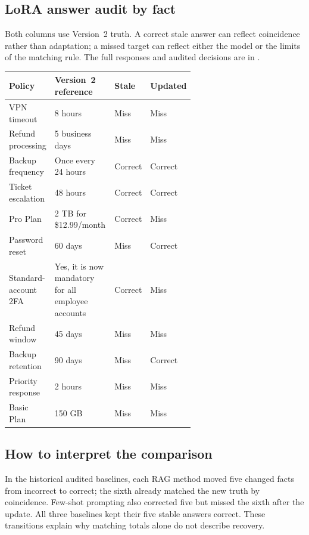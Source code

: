 \documentclass[10pt,letterpaper]{article}
\begin{document}
\subsection*{LoRA answer audit by fact}
Both columns use Version~2 truth. A correct stale answer can reflect coincidence rather than adaptation; a missed target can reflect either the model or the limits of the matching rule. The full responses and audited decisions are in .
\begin{center}\small
\begin{tabular}{P{0.22\linewidth}P{0.40\linewidth}ll}\toprule
Policy & Version~2 reference & Stale & Updated\\\midrule
VPN timeout & 8 hours & Miss & Miss\\
Refund processing & 5 business days & Miss & Miss\\
Backup frequency & Once every 24 hours & Correct & Correct\\
Ticket escalation & 48 hours & Correct & Correct\\
Pro Plan & 2 TB for \$12.99/month & Correct & Miss\\
Password reset & 60 days & Miss & Correct\\
Standard-account 2FA & Yes, it is now mandatory for all employee accounts & Correct & Miss\\
Refund window & 45 days & Miss & Miss\\
Backup retention & 90 days & Miss & Correct\\
Priority response & 2 hours & Miss & Miss\\
Basic Plan & 150 GB & Miss & Miss\\\bottomrule
\end{tabular}\end{center}
\subsection*{How to interpret the comparison}
In the historical audited baselines, each RAG method moved five changed facts from incorrect to correct; the sixth already matched the new truth by coincidence. Few-shot prompting also corrected five but missed the sixth after the update. All three baselines kept their five stable answers correct. These transitions explain why matching totals alone do not describe recovery.
\end{document}
